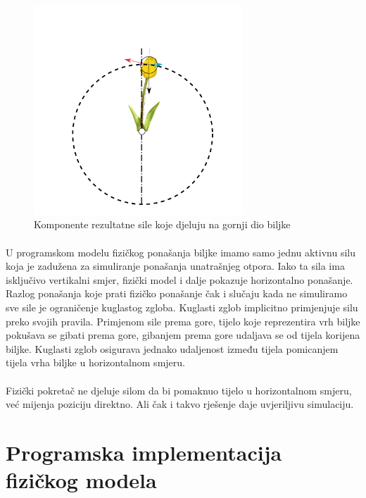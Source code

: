 \documentclass[times, utf8, diplomski]{fer}
\begin{document}
\begin{figure}[h]
	\centering
	\includegraphics[width=0.7\textwidth]{img/321-1}
	\caption{Komponente rezultatne sile koje djeluju na gornji dio biljke}
	\label{fig:321-1}
\end{figure}

\paragraph{}
U programskom modelu fizičkog ponašanja biljke imamo samo jednu aktivnu silu koja je 
zadužena za simuliranje ponašanja unatrašnjeg otpora. Iako ta sila ima isključivo vertikalni 
smjer, fizički model i dalje pokazuje horizontalno ponašanje. Razlog ponašanja koje prati 
fizičko ponašanje čak i slučaju kada ne simuliramo sve sile je ograničenje kuglastog zgloba.
Kuglasti zglob implicitno primjenjuje silu preko svojih pravila. Primjenom sile prema gore, 
tijelo koje reprezentira vrh biljke pokušava se gibati prema gore, gibanjem prema gore 
udaljava se od tijela korijena biljke. Kuglasti zglob osigurava jednako udaljenost između 
tijela pomicanjem tijela vrha biljke u horizontalnom smjeru.

\paragraph{}
Fizički pokretač ne djeluje silom da bi pomaknuo tijelo u horizontalnom smjeru, već mijenja 
poziciju direktno. Ali čak i takvo rješenje daje uvjeriljivu simulaciju.


\section{Programska implementacija fizičkog modela}
\end{document}

